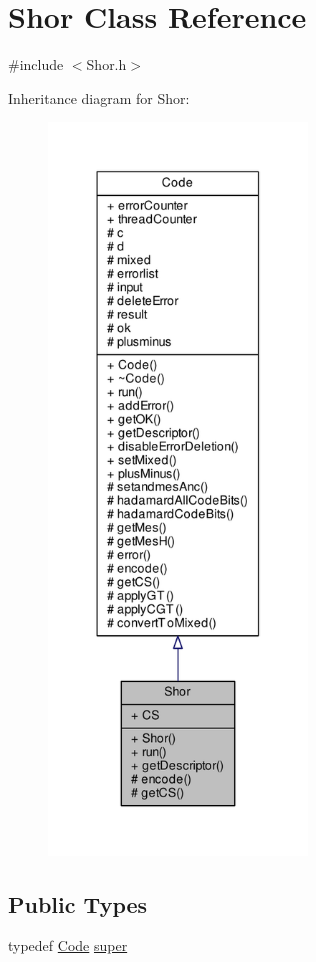 \hypertarget{class_shor}{}\section{Shor Class Reference}
\label{class_shor}


{\ttfamily \#include $<$Shor.\+h$>$}



Inheritance diagram for Shor\+:
\nopagebreak
\begin{figure}[H]
\begin{center}
\leavevmode
\includegraphics[height=550pt]{class_shor__inherit__graph}
\end{center}
\end{figure}
\subsection*{Public Types}
\begin{DoxyCompactItemize}
\item 
typedef \hyperlink{class_code}{Code} \hyperlink{class_shor_a7ea95c357f9d816b3a37176aa4e01781}{super}
\end{DoxyCompactItemize}
